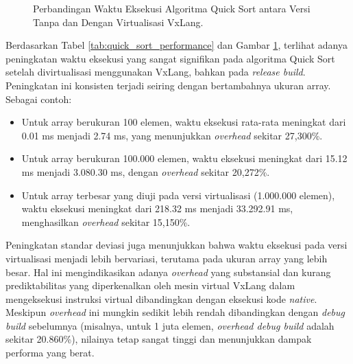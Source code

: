 \begin{figure}[H] %
    \centering
    \caption{Perbandingan Waktu Eksekusi Algoritma Quick Sort antara Versi Tanpa dan Dengan Virtualisasi VxLang.}
    \label{fig:quick_sort_performance}
\end{figure}

Berdasarkan Tabel \ref{tab:quick_sort_performance} dan Gambar \ref{fig:quick_sort_performance}, terlihat adanya peningkatan waktu eksekusi yang sangat signifikan pada algoritma Quick Sort setelah divirtualisasi menggunakan VxLang, bahkan pada \textit{release build}. Peningkatan ini konsisten terjadi seiring dengan bertambahnya ukuran array. Sebagai contoh:
\begin{itemize}
    \item Untuk array berukuran 100 elemen, waktu eksekusi rata-rata meningkat dari 0.01 ms menjadi 2.74 ms, yang menunjukkan \textit{overhead} sekitar 27,300\%.
    \item Untuk array berukuran 100.000 elemen, waktu eksekusi meningkat dari 15.12 ms menjadi 3.080.30 ms, dengan \textit{overhead} sekitar 20,272\%.
    \item Untuk array terbesar yang diuji pada versi virtualisasi (1.000.000 elemen), waktu eksekusi meningkat dari 218.32 ms menjadi 33.292.91 ms, menghasilkan \textit{overhead} sekitar 15,150\%.
\end{itemize}
Peningkatan standar deviasi juga menunjukkan bahwa waktu eksekusi pada versi virtualisasi menjadi lebih bervariasi, terutama pada ukuran array yang lebih besar. Hal ini mengindikasikan adanya \textit{overhead} yang substansial dan kurang prediktabilitas yang diperkenalkan oleh mesin virtual VxLang dalam mengeksekusi instruksi virtual dibandingkan dengan eksekusi kode \textit{native}. Meskipun \textit{overhead} ini mungkin sedikit lebih rendah dibandingkan dengan \textit{debug build} sebelumnya (misalnya, untuk 1 juta elemen, \textit{overhead debug build} adalah sekitar 20.860\%), nilainya tetap sangat tinggi dan menunjukkan dampak performa yang berat.


